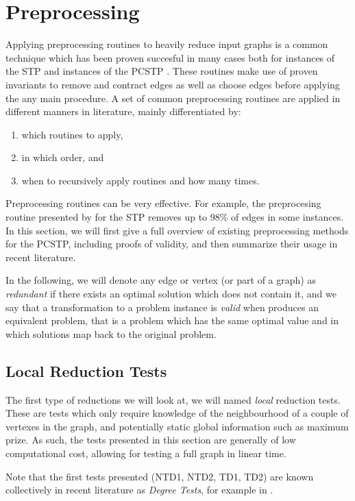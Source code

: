  \section{Preprocessing}
 \label{sec:solving:pre}
Applying preprocessing routines to heavily reduce input graphs is a common technique which has been proven succesful in many cases both for instances of the STP
\citep{koch1998solving}
and instances of the PCSTP
\citep{lucena2004strong,canuto2001local,ljubic2005solving, gamrath2017scip}. %
These routines make use of proven invariants to remove and contract edges as well as choose edges before applying the any main procedure.
A set of common preprocessing routines are applied in different manners in literature, mainly differentiated by:
\begin{enumerate}[label=\alph*)]
\item which routines to apply,
\item in which order, and
\item when to recursively apply routines and how many times.
\end{enumerate}
Preprocessing routines can be very effective. For example, the preprocesing routine presented by \cite{koch1998solving} for the STP removes
up to 98\% of edges in some instances. In this section, we will first give a full overview of existing preprocessing methods for the PCSTP,
 including proofs of validity,
 and then summarize their usage in recent literature.

 In the following, we will denote any edge or vertex (or part of a graph) as \textit{redundant} if there exists an optimal solution
  which does not contain it, and we say that a 
  transformation to a problem instance is \textit{valid} when produces an equivalent problem, that is a problem which has the same optimal
  value and in which solutions map back to the original problem.

 \subsection{Local Reduction Tests}
 The first type of reductions we will look at, we will named \textit{local} reduction tests. These are tests which only require knowledge
 of the neighbourhood of a couple of vertexes in the graph, and potentially static global information
 such as maximum prize. As such, the tests
 presented in this section are generally of low computational cost, allowing for testing a full graph in linear time.

 Note that the first tests presented (NTD1, NTD2, TD1, TD2) are known collectively
 in recent literature as \textit{Degree Tests}, for example in \cite{rehfeldt2016reduction}.
